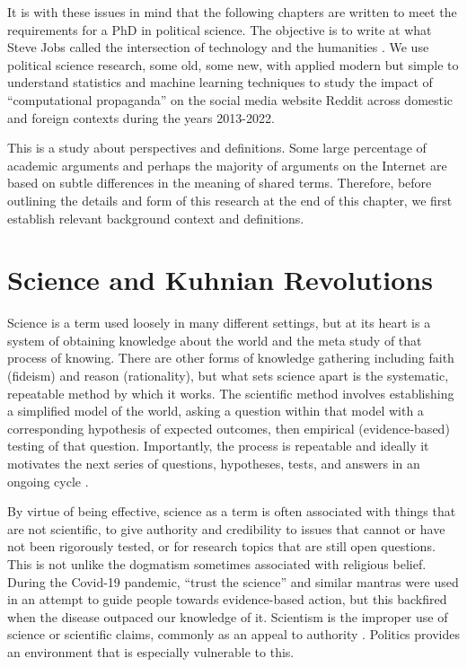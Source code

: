 \documentclass[doublespacing]{utdthesis}
\let\cite=\citep
\begin{document}
It is with these issues in mind that the following chapters are written to meet the requirements for a PhD in political science.
The objective is to write at what Steve Jobs called the intersection of technology and the humanities \cite{isaacson2012}.
We use political science research, some old, some new, with applied modern but simple to understand statistics and machine learning techniques to study the impact of ``computational propaganda'' on the social media website Reddit across domestic and foreign contexts during the years 2013-2022.

This is a study about perspectives and definitions.
Some large percentage of academic arguments and perhaps the majority of arguments on the Internet are based on subtle differences in the meaning of shared terms.
Therefore, before outlining the details and form of this research at the end of this chapter, we first establish relevant background context and definitions.

\section{Science and Kuhnian Revolutions}

Science is a term used loosely in many different settings, but at its heart is a system of obtaining knowledge about the world and the meta study of that process of knowing.
There are other forms of knowledge gathering including faith (fideism) and reason (rationality), but what sets science apart is the systematic, repeatable method by which it works.
The scientific method involves establishing a simplified model of the world, asking a question within that model with a corresponding hypothesis of expected outcomes, then empirical (evidence-based) testing of that question.
Importantly, the process is repeatable and ideally it motivates the next series of questions, hypotheses, tests, and answers in an ongoing cycle \cite{gauch2012}.

By virtue of being effective, science as a term is often associated with things that are not scientific, to give authority and credibility to issues that cannot or have not been rigorously tested, or for research topics that are still open questions.
This is not unlike the dogmatism sometimes associated with religious belief.
During the Covid-19 pandemic, ``trust the science'' and similar mantras were used in an attempt to guide people towards evidence-based action, but this backfired when the disease outpaced our knowledge of it.
Scientism is the improper use of science or scientific claims, commonly as an appeal to authority \cite[p. 753]{peterson2003}.
Politics provides an environment that is especially vulnerable to this.
\end{document}

